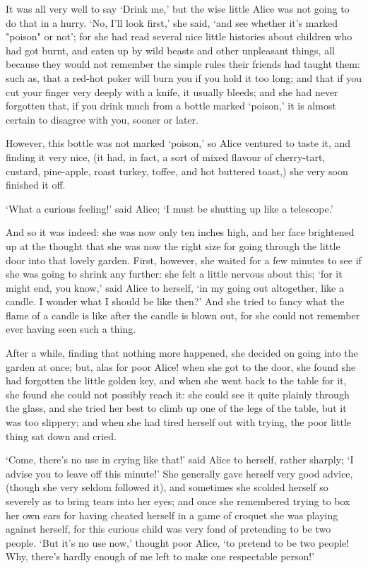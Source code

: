 \documentclass[
    11pt,
    a4paper
]{article}
\begin{document}
It was all very well to say `Drink me,' but the wise little Alice was
not going to do {that} in a hurry. `No, I'll look first,' she said, `and
see whether it's marked "poison" or not'; for she had read several nice
little histories about children who had got burnt, and eaten up by wild
beasts and other unpleasant things, all because they {would} not remember
the simple rules their friends had taught them: such as, that a red-hot
poker will burn you if you hold it too long; and that if you cut your
finger {very} deeply with a knife, it usually bleeds; and she had never
forgotten that, if you drink much from a bottle marked `poison,' it is
almost certain to disagree with you, sooner or later.

However, this bottle was {not} marked `poison,' so Alice ventured to taste
it, and finding it very nice, (it had, in fact, a sort of mixed flavour
of cherry-tart, custard, pine-apple, roast turkey, toffee, and hot
buttered toast,) she very soon finished it off.

`What a curious feeling!' said Alice; `I must be shutting up like a
telescope.'

And so it was indeed: she was now only ten inches high, and her face
brightened up at the thought that she was now the right size for going
through the little door into that lovely garden. First, however, she
waited for a few minutes to see if she was going to shrink any further:
she felt a little nervous about this; `for it might end, you know,' said
Alice to herself, `in my going out altogether, like a candle. I wonder
what I should be like then?' And she tried to fancy what the flame of a
candle is like after the candle is blown out, for she could not remember
ever having seen such a thing.

After a while, finding that nothing more happened, she decided on going
into the garden at once; but, alas for poor Alice! when she got to the
door, she found she had forgotten the little golden key, and when she
went back to the table for it, she found she could not possibly reach
it: she could see it quite plainly through the glass, and she tried her
best to climb up one of the legs of the table, but it was too slippery;
and when she had tired herself out with trying, the poor little thing
sat down and cried.

`Come, there's no use in crying like that!' said Alice to herself,
rather sharply; `I advise you to leave off this minute!' She generally
gave herself very good advice, (though she very seldom followed it),
and sometimes she scolded herself so severely as to bring tears into
her eyes; and once she remembered trying to box her own ears for having
cheated herself in a game of croquet she was playing against herself,
for this curious child was very fond of pretending to be two people.
`But it's no use now,' thought poor Alice, `to pretend to be two people!
Why, there's hardly enough of me left to make {one} respectable person!'
\end{document}
